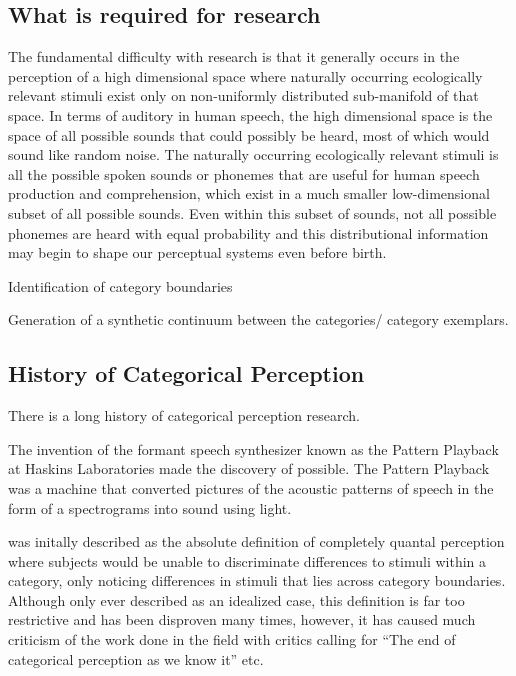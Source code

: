 \subsection{What is required for \CP research}

The fundamental difficulty with \CP research is that it generally occurs in the perception of a high dimensional space where naturally occurring ecologically relevant stimuli exist only on non-uniformly distributed sub-manifold of that space. In terms of auditory \CP in human speech, the high dimensional space is the space of all possible sounds that could possibly be heard, most of which would sound like random noise. The naturally occurring ecologically relevant stimuli is all the possible spoken sounds or phonemes that are useful for human speech production and comprehension, which exist in a much smaller low-dimensional subset of all possible sounds. Even within this subset of sounds, not all possible phonemes are heard with equal probability and this distributional information may begin to shape our perceptual systems even before birth.

Identification of category boundaries

Generation of a synthetic continuum between the categories/ category exemplars.

\subsection{History of Categorical Perception}

There is a long history of categorical perception research.

The invention of the formant speech synthesizer known as the Pattern Playback at Haskins Laboratories\cite{patternplayback} made the discovery of \CP possible.
The Pattern Playback was a machine that converted pictures of the acoustic patterns of speech in the form of a spectrograms into sound using light.

\CP was initally described as the absolute definition of completely quantal perception where subjects would be unable to discriminate differences to stimuli within a category, only noticing differences in stimuli that lies across category boundaries\cite{liberman1957discrimination, Studdert1970motor}. Although only ever described as an idealized case, this definition is far too restrictive and has been disproven many times, however, it has caused much criticism of the work done in the \CP field with critics calling for ``The end of categorical perception as we know it''\cite{schouten2003end} etc.

